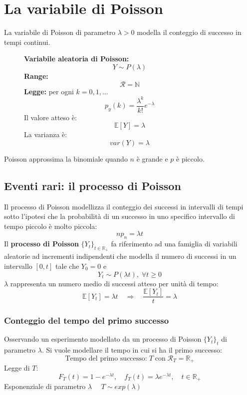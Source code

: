\documentclass[a4paper]{article}
\theoremstyle{break}
\theoremstyle{break}
\theoremstyle{break}
\theoremstyle{break}
\begin{document}
\section{La variabile di Poisson}
La variabile di Poisson di parametro \( \lambda > 0 \) modella il conteggio di successo
in tempi continui.
\begin{figure}[H]
  \begin{definition}
    \textbf{Variabile aleatoria di Poisson:}
    \[
    Y \sim P(\lambda)
    \] 
    \textbf{Range:}
    \[
      \mathcal{R} = \mathbb{N}
    \] 
    \textbf{Legge:} per ogni \( k = 0, 1, \ldots \) 
    \[
      p_y(k) = \frac{\lambda^k}{k!}e^{-\lambda}
    \] 
    Il valore atteso è:
    \[
      \mathbb{E}[Y] = \lambda
    \] 
    La varianza è:
    \[
    var(Y) = \lambda
    \] 
  \end{definition}
\end{figure}
\noindent Poisson approssima la binomiale quando \( n \) è grande e \( p \) è piccolo.

\subsection{Eventi rari: il processo di Poisson}
Il processo di Poisson modellizza il conteggio dei successi in intervalli di tempi
sotto l'ipotesi che la probabilità di un successo in uno specifico intervallo di tempo
piccolo è molto piccola:
\[
np_n = \lambda t
\] 
Il \textbf{processo di Poisson} \( \{Y_t\}_{t \in \mathbb{R}_+}  \) fa riferimento ad
una famiglia di variabili aleatorie ad incrementi indipendenti che modella il
numero di successi in un intervallo \( [0,t] \) tale che \( Y_0 = 0 \) e
\[
Y_t \sim P(\lambda t), \; \forall t \ge 0
\] 
\( \lambda \) rappresenta un numero medio di successi atteso per unità di tempo:
\[
  \mathbb{E}[Y_t] = \lambda t \quad \Rightarrow \quad \frac{\mathbb{E}[Y_t]}{t} = \lambda
\] 

\subsubsection{Conteggio del tempo del primo successo}
Osservando un esperimento modellato da un processo di Poisson \( \{Y_t\}_t  \) di 
parametro \( \lambda \). Si vuole modellare il tempo in cui si ha il primo successo:
\[
  \text{Tempo del primo successo:}\; T \;\text{con}\; \mathcal{R}_T = \mathbb{R}_+
\] 
Legge di \( T \):
\[
  F_T(t)= 1-e^{-\lambda t}, \quad f_T(t) = \lambda e^{-\lambda t}, \quad t \in \mathbb{R}_+
\] 
Esponenziale di parametro \( \lambda \quad \) \( T \sim exp(\lambda) \) 
\end{document}
